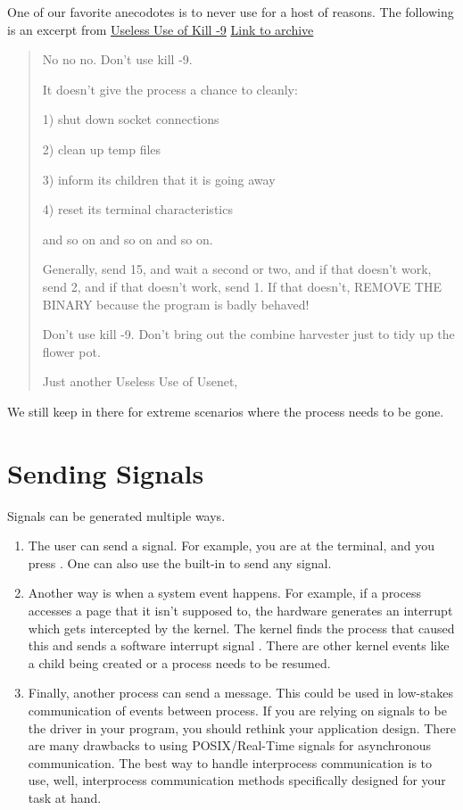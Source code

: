 One of our favorite anecodotes is to never use  for a host of reasons.
The following is an excerpt from \underline{Useless Use of Kill -9} \href{http://porkmail.org/era/unix/award.html}{Link to archive}

\begin{quote}
No no no.  Don't use kill -9.

It doesn't give the process a chance to cleanly:

1) shut down socket connections

2) clean up temp files

3) inform its children that it is going away

4) reset its terminal characteristics

and so on and so on and so on.

Generally, send 15, and wait a second or two, and if that doesn't
work, send 2, and if that doesn't work, send 1.  If that doesn't,
REMOVE THE BINARY because the program is badly behaved!

Don't use kill -9.  Don't bring out the combine harvester just to tidy
up the flower pot.

Just another Useless Use of Usenet,
\end{quote}

We still keep  in there for extreme scenarios where the process needs to be gone.

\section{Sending Signals}

Signals can be generated multiple ways.
\begin{enumerate}
\item The user can send a signal.
  For example, you are at the terminal, and you press .
  One can also use the built-in  to send any signal.
\item Another way is when a system event happens.
For example, if a process accesses a page that it isn't supposed to, the hardware generates an interrupt which gets intercepted by the kernel.
The kernel finds the process that caused this and sends a software interrupt signal .
There are other kernel events like a child being created or a process needs to be resumed.

\item Finally, another process can send a message.
  This could be used in low-stakes communication of events between process.
  If you are relying on signals to be the driver in your program, you should rethink your application design.
  There are many drawbacks to using POSIX/Real-Time signals for asynchronous communication.
  The best way to handle interprocess communication is to use, well, interprocess communication methods specifically designed for your task at hand.

\end{enumerate}

